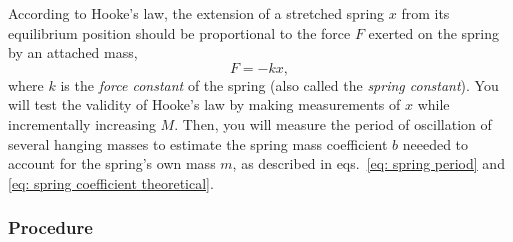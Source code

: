 \documentclass[addpoints]{physlabs}
\begin{document}
\begin{labsection}
\begin{experiment}
According to Hooke's law, the extension of a stretched spring $x$ from its equilibrium position should be proportional to the force $F$ exerted on the spring by an attached mass,
%
\begin{equation}\label{eq: hookes law}
    F = -kx,
\end{equation}
%
where $k$ is the {\sl force constant} of the spring (also called the {\sl spring constant}). 
You will test the validity of Hooke's law by making measurements of $x$ while incrementally increasing $M$. 
Then, you will measure the period of oscillation of several hanging masses to estimate the spring mass coefficient $b$ neeeded to account for the spring's own mass $m$, as described in eqs.~\ref{eq: spring period} and \ref{eq: spring coefficient theoretical}.

\subsubsection*{Procedure}


\end{experiment}
\end{labsection}
\end{document}
